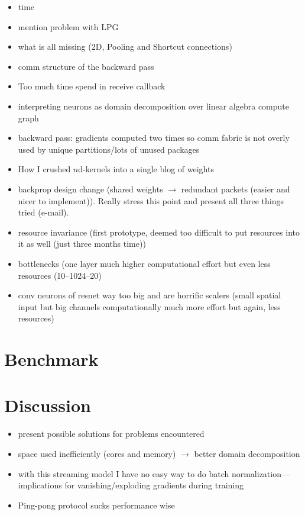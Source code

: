 \documentclass[]{article}
\begin{document}
\begin{itemize}
  \item time
  \item mention problem with LPG
  \item what is all missing (2D, Pooling and Shortcut connections)
  \item comm structure of the backward pass
  \item Too much time spend in receive callback
  \item interpreting neurons as domain decomposition over linear algebra
    compute graph
  \item backward pass: gradients computed two times so comm fabric is
    not overly used by unique partitions/lots of unused packages
  \item How I crushed $n$d-kernels into a single blog of weights
  \item backprop design change (shared weights $\rightarrow$ redundant
    packets (easier and nicer to implement)).
    Really stress this point and present all three things tried
    (e-mail).
  \item resource invariance (first prototype, deemed too difficult
    to put resources into it as well (just three months time))
  \item bottlenecks (one layer much higher
    computational effort but even less resources (10--1024--20)
  \item conv neurons of resnet way too big and are horrific scalers
    (small spatial input but big channels computationally much more
    effort but again, less resources)
\end{itemize}




\section{Benchmark}
\label{sec:benchmark}

\section{Discussion}
\label{sec:discussion}

\begin{itemize}
  \item present possible solutions for problems encountered
  \item space used inefficiently (cores and memory) $\rightarrow$ better
    domain decomposition
  \item with this streaming model I have no easy way to do batch
    normalization---implications for vanishing/exploding gradients
    during training
  \item Ping-pong protocol sucks performance wise
\end{itemize}
\end{document}
